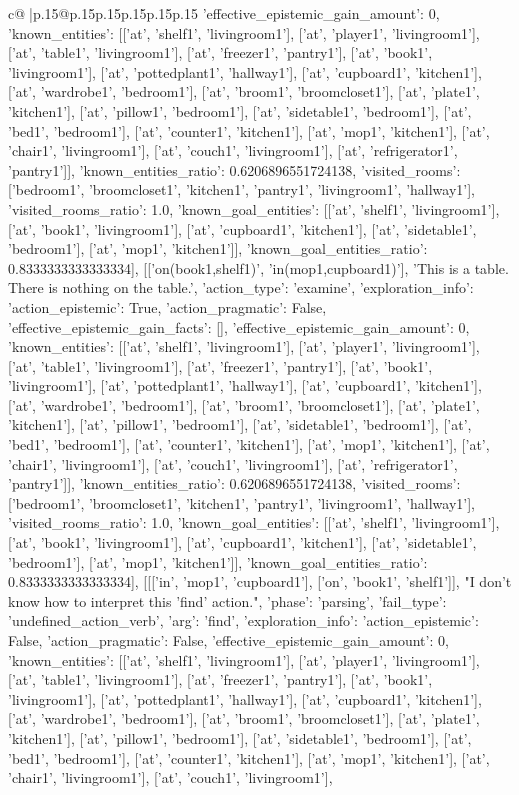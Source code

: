 \documentclass{article}
\begin{document}
{\begin{supertabular}{c@{$\;$}|p{.15\linewidth}@{}p{.15\linewidth}p{.15\linewidth}p{.15\linewidth}p{.15\linewidth}p{.15\linewidth}}
{{{'effective_epistemic_gain_amount': 0, 'known_entities': [['at', 'shelf1', 'livingroom1'], ['at', 'player1', 'livingroom1'], ['at', 'table1', 'livingroom1'], ['at', 'freezer1', 'pantry1'], ['at', 'book1', 'livingroom1'], ['at', 'pottedplant1', 'hallway1'], ['at', 'cupboard1', 'kitchen1'], ['at', 'wardrobe1', 'bedroom1'], ['at', 'broom1', 'broomcloset1'], ['at', 'plate1', 'kitchen1'], ['at', 'pillow1', 'bedroom1'], ['at', 'sidetable1', 'bedroom1'], ['at', 'bed1', 'bedroom1'], ['at', 'counter1', 'kitchen1'], ['at', 'mop1', 'kitchen1'], ['at', 'chair1', 'livingroom1'], ['at', 'couch1', 'livingroom1'], ['at', 'refrigerator1', 'pantry1']], 'known_entities_ratio': 0.6206896551724138, 'visited_rooms': ['bedroom1', 'broomcloset1', 'kitchen1', 'pantry1', 'livingroom1', 'hallway1'], 'visited_rooms_ratio': 1.0, 'known_goal_entities': [['at', 'shelf1', 'livingroom1'], ['at', 'book1', 'livingroom1'], ['at', 'cupboard1', 'kitchen1'], ['at', 'sidetable1', 'bedroom1'], ['at', 'mop1', 'kitchen1']], 'known_goal_entities_ratio': 0.8333333333333334}}], [['on(book1,shelf1)', 'in(mop1,cupboard1)'], 'This is a table. There is nothing on the table.', {'action_type': 'examine', 'exploration_info': {'action_epistemic': True, 'action_pragmatic': False, 'effective_epistemic_gain_facts': [], 'effective_epistemic_gain_amount': 0, 'known_entities': [['at', 'shelf1', 'livingroom1'], ['at', 'player1', 'livingroom1'], ['at', 'table1', 'livingroom1'], ['at', 'freezer1', 'pantry1'], ['at', 'book1', 'livingroom1'], ['at', 'pottedplant1', 'hallway1'], ['at', 'cupboard1', 'kitchen1'], ['at', 'wardrobe1', 'bedroom1'], ['at', 'broom1', 'broomcloset1'], ['at', 'plate1', 'kitchen1'], ['at', 'pillow1', 'bedroom1'], ['at', 'sidetable1', 'bedroom1'], ['at', 'bed1', 'bedroom1'], ['at', 'counter1', 'kitchen1'], ['at', 'mop1', 'kitchen1'], ['at', 'chair1', 'livingroom1'], ['at', 'couch1', 'livingroom1'], ['at', 'refrigerator1', 'pantry1']], 'known_entities_ratio': 0.6206896551724138, 'visited_rooms': ['bedroom1', 'broomcloset1', 'kitchen1', 'pantry1', 'livingroom1', 'hallway1'], 'visited_rooms_ratio': 1.0, 'known_goal_entities': [['at', 'shelf1', 'livingroom1'], ['at', 'book1', 'livingroom1'], ['at', 'cupboard1', 'kitchen1'], ['at', 'sidetable1', 'bedroom1'], ['at', 'mop1', 'kitchen1']], 'known_goal_entities_ratio': 0.8333333333333334}}], [[['in', 'mop1', 'cupboard1'], ['on', 'book1', 'shelf1']], "I don't know how to interpret this 'find' action.", {'phase': 'parsing', 'fail_type': 'undefined_action_verb', 'arg': 'find', 'exploration_info': {'action_epistemic': False, 'action_pragmatic': False, 'effective_epistemic_gain_amount': 0, 'known_entities': [['at', 'shelf1', 'livingroom1'], ['at', 'player1', 'livingroom1'], ['at', 'table1', 'livingroom1'], ['at', 'freezer1', 'pantry1'], ['at', 'book1', 'livingroom1'], ['at', 'pottedplant1', 'hallway1'], ['at', 'cupboard1', 'kitchen1'], ['at', 'wardrobe1', 'bedroom1'], ['at', 'broom1', 'broomcloset1'], ['at', 'plate1', 'kitchen1'], ['at', 'pillow1', 'bedroom1'], ['at', 'sidetable1', 'bedroom1'], ['at', 'bed1', 'bedroom1'], ['at', 'counter1', 'kitchen1'], ['at', 'mop1', 'kitchen1'], ['at', 'chair1', 'livingroom1'], ['at', 'couch1', 'livingroom1'], }}}
\end{supertabular}}
\end{document}
